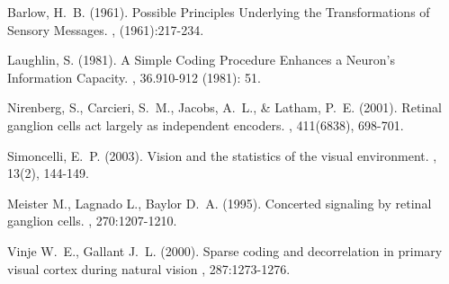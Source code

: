 \documentclass[twoside]{article}
\begin{document}
\begin{multicols}{2}
\begin{thebibliography}{99} 

Barlow, H.~B. (1961).
\newblock Possible Principles Underlying the Transformations of Sensory Messages.
, (1961):217-234.

Laughlin, S. (1981).
\newblock A Simple Coding Procedure Enhances a Neuron's Information Capacity.
, 36.910-912 (1981): 51.

Nirenberg, S., Carcieri, S.~M., Jacobs, A.~L., \& Latham, P.~E. (2001).
\newblock Retinal ganglion cells act largely as independent encoders.
, 411(6838), 698-701.

Simoncelli, E.~P. (2003).
\newblock  Vision and the statistics of the visual environment.
, 13(2), 144-149.

\bibitem[Meister et. al., 1995]
Meister M., Lagnado L., Baylor D.~A. (1995). 
\newblock Concerted signaling by retinal ganglion cells. 
, 270:1207-1210.

\bibitem[Vinje 2000]
Vinje W.~E., Gallant J.~L. (2000).
\newblock Sparse coding and decorrelation in primary visual cortex during natural vision
, 287:1273-1276.

 
\end{thebibliography}



\end{multicols}
\end{document}
